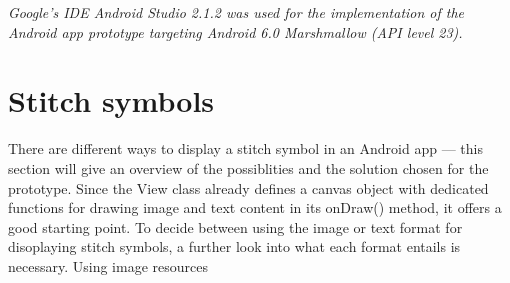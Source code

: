 \textit{Google’s IDE Android Studio 2.1.2 was used for the implementation of the Android app prototype targeting Android 6.0 Marshmallow (\gls{API} level 23).} 

\section{Stitch symbols}
There are different ways to display a stitch symbol in an Android app --- this section will give an overview of the possiblities and the solution chosen for the prototype. 
Since the View class already defines a canvas object with dedicated functions for drawing image and text content in its onDraw() method, it offers a good starting point. To decide between using the image or text format for disoplaying stitch symbols, a further look into what each format entails is necessary. Using image resources 

